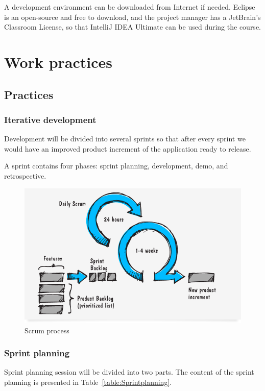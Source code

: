 A development environment can be downloaded from Internet if needed. Eclipse is 
an open-source and free to download, and the project manager has a JetBrain's 
Classroom License, so that IntelliJ IDEA Ultimate can be used during the course.

\section{Work practices}
\subsection{Practices}
\subsubsection{Iterative development}

Development will be divided into several sprints so that after every sprint we 
would have an improved product increment of the application ready to release. 

A sprint contains four phases: sprint planning, development, demo, and 
retrospective. 

\begin{figure}[H]
\centering
\includegraphics[width=1\textwidth]{imgs/scrum_process_en.png}
\caption{Scrum process}
\label{fig:scrum}
\end{figure}

\subsubsection{Sprint planning}

Sprint planning session will be divided into two parts. The content of the 
sprint planning is presented in Table~\ref{table:Sprintplanning}.

